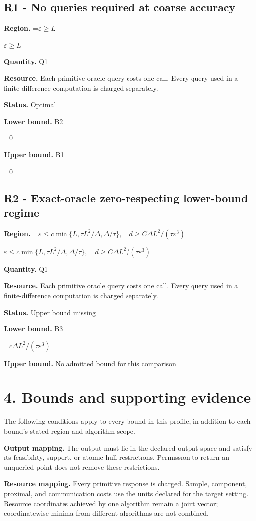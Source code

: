 \documentclass[10pt,a4paper]{article}
\newcommand{\AtlasMath}[1]{\par\begingroup\centering\setbox0=\hbox{$\displaystyle #1$}\ifdim\wd0>1.4\linewidth\typeout{ATLAS WIDE FORMULA: \the\wd0}\fi\ifdim\wd0>\linewidth\resizebox{\linewidth}{!}{\box0}\else\box0\fi\par\endgroup}
\newcommand{\AtlasInlineMath}[1]{\begingroup\setbox0=\hbox{$#1$}\ifdim\wd0>.4\linewidth\endgroup\AtlasMath{#1}\else\endgroup$#1$\fi}
\begin{document}
\subsection{R1 - No queries required at coarse accuracy}
\textbf{Region.} \AtlasInlineMath{\varepsilon\ge L}

\textbf{Quantity.} Q1

\textbf{Resource.} Each primitive oracle query costs one call. Every query used in a finite-difference computation is charged separately.

\textbf{Status.} Optimal

\textbf{Lower bound.} B2

\AtlasMath{0}
\textbf{Upper bound.} B1

\AtlasMath{0}
\subsection{R2 - Exact-oracle zero-respecting lower-bound regime}
\textbf{Region.} \AtlasInlineMath{\varepsilon\le c\min\{L,\tau L^2/\Delta,\Delta/\tau\},\quad d\ge C\Delta L^2/(\tau\varepsilon^3)}

\textbf{Quantity.} Q1

\textbf{Resource.} Each primitive oracle query costs one call. Every query used in a finite-difference computation is charged separately.

\textbf{Status.} Upper bound missing

\textbf{Lower bound.} B3

\AtlasMath{c\Delta L^2/(\tau\varepsilon^3)}
\textbf{Upper bound.} No admitted bound for this comparison

\section{4. Bounds and supporting evidence}
The following conditions apply to every bound in this profile, in addition to each bound's stated region and algorithm scope.

\textbf{Output mapping.} The output must lie in the declared output space and satisfy its feasibility, support, or atomic-hull restrictions. Permission to return an unqueried point does not remove these restrictions.

\textbf{Resource mapping.} Every primitive response is charged. Sample, component, proximal, and communication costs use the units declared for the target setting. Resource coordinates achieved by one algorithm remain a joint vector; coordinatewise minima from different algorithms are not combined.
\end{document}
